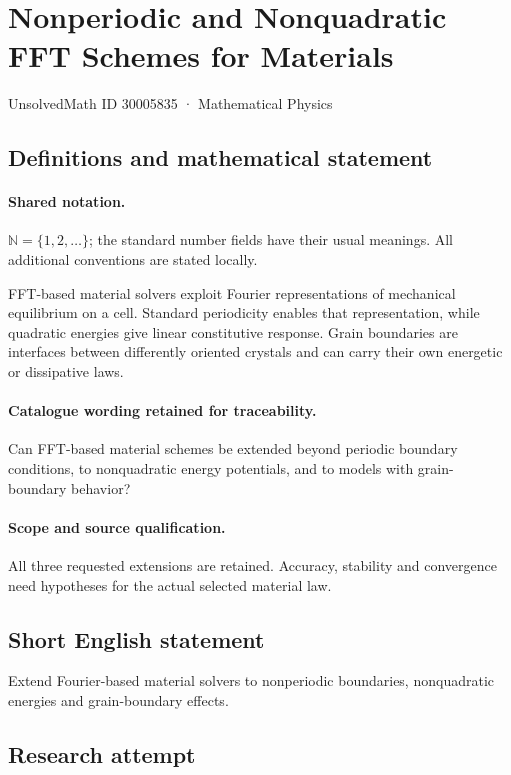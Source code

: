 \documentclass[11pt]{article}
\begin{document}
\setcounter{section}{30005834}
\section{Nonperiodic and Nonquadratic FFT Schemes for Materials}\label{30005835}
{\small UnsolvedMath ID 30005835 · Mathematical Physics}
\subsection{Definitions and mathematical statement}

\paragraph{Shared notation.}$\mathbb N=\{1,2,\ldots\}$; the standard number fields have their usual meanings. All additional conventions are stated locally.


FFT-based material solvers exploit Fourier representations of mechanical equilibrium on a cell. Standard periodicity enables that representation, while quadratic energies give linear constitutive response. Grain boundaries are interfaces between differently oriented crystals and can carry their own energetic or dissipative laws.

\paragraph{Catalogue wording retained for traceability.}
Can FFT-based material schemes be extended beyond periodic boundary conditions, to nonquadratic energy potentials, and to models with grain-boundary behavior?

\paragraph{Scope and source qualification.}All three requested extensions are retained. Accuracy, stability and convergence need hypotheses for the actual selected material law.
\subsection{Short English statement}
Extend Fourier-based material solvers to nonperiodic boundaries, nonquadratic energies and grain-boundary effects.
\subsection{Research attempt}
\end{document}
